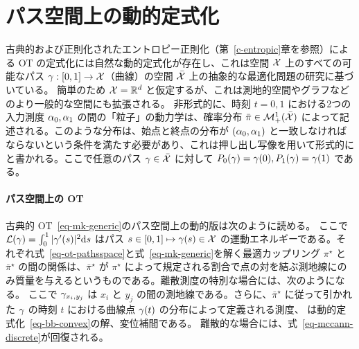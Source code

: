 \section{パス空間上の動的定式化}
\label{sec-entropic-dynamic}

古典的および正則化されたエントロピー正則化（第~\ref{c-entropic}章を参照）による OT の定式化には自然な動的定式化が存在し、これは空間 $\mathcal{X}$ 上のすべての可能なパス $\gamma : [0,1] \rightarrow \mathcal{X}$（\ie 曲線）の空間 $\bar{\mathcal{X}}$ 上の抽象的な最適化問題の研究に基づいている。
簡単のため $\mathcal{X}=\mathbb{R}^d$ と仮定するが、これは測地的空間やグラフなどのより一般的な空間にも拡張される。
非形式的に、時刻 $t=0,1$ における2つの入力測度 $\alpha_0,\alpha_1$ の間の「粒子」の動力学は、確率分布 $\bar\pi \in \mathcal{M}_+^1(\bar{\mathcal{X}})$ によって記述される。このような分布は、始点と終点の分布が $(\alpha_0,\alpha_1)$ と一致しなければならないという条件を満たす必要があり、これは押し出し写像を用いて形式的に
と書かれる。ここで任意のパス $\gamma \in \bar{\mathcal{X}}$ に対して $P_0(\gamma) = \gamma(0), P_1(\gamma) = \gamma(1)$ である。

\paragraph{パス空間上の OT}

古典的 OT~\eqref{eq-mk-generic}のパス空間上の動的版は次のように読める。
ここで $\mathcal{L}(\gamma) = \int_0^1 |\gamma'(s)|^2 \mathrm{d} s$ はパス $s \in [0,1] \mapsto \gamma(s) \in \mathcal{X}$ の運動エネルギーである。それぞれ式~\eqref{eq-ot-pathsspace}と式~\eqref{eq-mk-generic}を解く最適カップリング $\pi^\star$ と $\bar\pi^\star$ の間の関係は、$\bar\pi^\star$ が $\pi^\star$ によって規定される割合で点の対を結ぶ測地線にのみ質量を与えるというものである。離散測度の特別な場合には、次のようになる。
ここで $\gamma_{x_i,y_j}$ は $x_i$ と $y_j$ の間の測地線である。さらに、$\bar\pi^\star$ に従って引かれた $\gamma$ の時刻 $t$ における曲線点 $\gamma(t)$ の分布によって定義される測度、\ie
{}
は動的定式化~\eqref{eq-bb-convex}の解、\ie 変位補間である。
離散的な場合には、式~\eqref{eq-mccann-discrete}が回復される。

